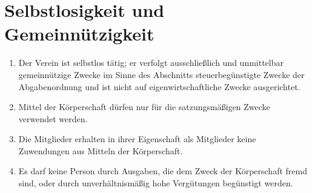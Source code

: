 \documentclass[10pt,conference,a4paper,nofonttune]{IEEEtran}
\begin{document}
\section{Selbstlosigkeit und Gemeinnützigkeit}
\begin{enumerate}
  \item Der Verein ist selbstlos tätig; er verfolgt ausschließlich und
    unmittelbar gemeinnützige Zwecke im Sinne des Abschnitts
    \glqq steuerbegünstigte Zwecke \grqq der Abgabenordnung und ist nicht auf
    eigenwirtschaftliche Zwecke ausgerichtet.

  \item Mittel der Körperschaft dürfen nur für die satzungsmäßigen Zwecke
    verwendet werden.

  \item Die Mitglieder erhalten in ihrer Eigenschaft als Mitglieder keine
    Zuwendungen aus Mitteln der Körperschaft.

  \item Es darf keine Person durch Ausgaben, die dem Zweck der Körperschaft
    fremd sind, oder durch unverhältnismäßig hohe Vergütungen begünstigt werden.
\end{enumerate}
\end{document}
